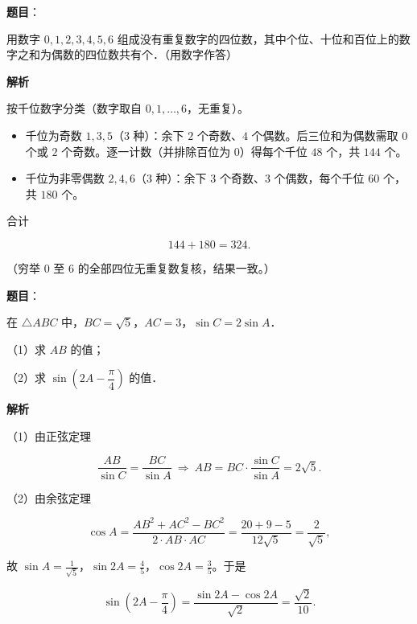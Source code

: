 \begin{answer}

\textbf{题目}：

用数字 $0,1,2,3,4,5,6$ 组成没有重复数字的四位数，其中个位、十位和百位上的数字之和为偶数的四位数共有\gkblank{}个．（用数字作答）

\textbf{解析}

按千位数字分类（数字取自 $0,1,\dots,6$，无重复）。

\begin{itemize}
\item 千位为奇数 $1,3,5$（$3$ 种）：余下 $2$ 个奇数、$4$ 个偶数。后三位和为偶数需取 $0$ 个或 $2$ 个奇数。逐一计数（并排除百位为 $0$）得每个千位 $48$ 个，共 $144$ 个。
\item 千位为非零偶数 $2,4,6$（$3$ 种）：余下 $3$ 个奇数、$3$ 个偶数，每个千位 $60$ 个，共 $180$ 个。
\end{itemize}

合计

\nopagebreak[4]
\[144+180=324 .\]

（穷举 $0$ 至 $6$ 的全部四位无重复数复核，结果一致。）


\end{answer}
\begin{answer}

\textbf{题目}：

在 $\triangle ABC$ 中，$BC=\sqrt5$，$AC=3$，$\sin C=2\sin A$．

（1）求 $AB$ 的值；

（2）求 $\sin\left(2A-\dfrac{\pi}{4}\right)$ 的值．

\textbf{解析}

（1）由正弦定理

\nopagebreak[4]
\[\frac{AB}{\sin C}=\frac{BC}{\sin A}
\ \Longrightarrow\ AB=BC\cdot\frac{\sin C}{\sin A}=2\sqrt5 .\]

（2）由余弦定理

\nopagebreak[4]
\[\cos A=\frac{AB^2+AC^2-BC^2}{2\cdot AB\cdot AC}
=\frac{20+9-5}{12\sqrt5}=\frac2{\sqrt5},\]

故 $\sin A=\frac1{\sqrt5}$，$\sin2A=\frac45$，$\cos2A=\frac35$。于是

\nopagebreak[4]
\[\sin\left(2A-\frac\pi4\right)
=\frac{\sin2A-\cos2A}{\sqrt2}=\frac{\sqrt2}{10} .\]


\end{answer}
